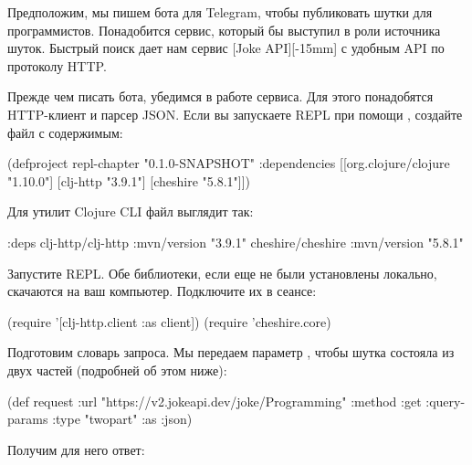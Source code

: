\def\urljokeapi{https://jokeapi.dev/}

Предположим, мы пишем бота для Telegram, чтобы публиковать шутки для программистов. Понадобится сервис, который бы выступил в роли источника шуток. Быстрый поиск дает нам сервис \footurl{Joke API}{\urljokeapi}[Joke API][-15mm] с удобным API по протоколу HTTP.

Прежде чем писать бота, убедимся в работе сервиса. Для этого понадобятся HTTP-клиент и парсер JSON. Если вы запускаете REPL при помощи , создайте файл  с содержимым:

\begin{english}
  \begin{clojure}
(defproject repl-chapter "0.1.0-SNAPSHOT"
  :dependencies [[org.clojure/clojure "1.10.0"]
                 [clj-http "3.9.1"]
                 [cheshire "5.8.1"]])
  \end{clojure}
\end{english}

Для утилит Clojure CLI файл  выглядит так:

\begin{english}
  \begin{clojure}
{:deps
 {clj-http/clj-http {:mvn/version "3.9.1"}
  cheshire/cheshire {:mvn/version "5.8.1"}}}
  \end{clojure}
\end{english}

Запустите REPL. Обе библиотеки, если еще не были установлены локально, скачаются на ваш компьютер. Подключите их в сеансе:

\begin{english}
  \begin{clojure}
(require '[clj-http.client :as client])
(require 'cheshire.core)
  \end{clojure}
\end{english}

Подготовим словарь запроса. Мы передаем параметр , чтобы шутка состояла из двух частей (подробней об этом ниже):

\begin{english}
  \begin{clojure}
(def request
  {:url "https://v2.jokeapi.dev/joke/Programming"
   :method :get
   :query-params {:type "twopart"}
   :as :json})
  \end{clojure}
\end{english}

Получим для него ответ:


